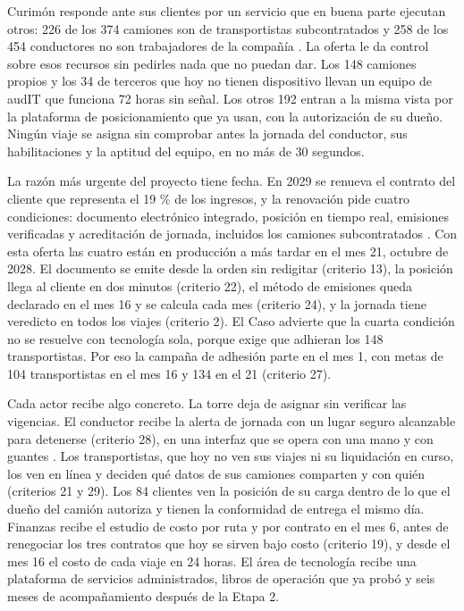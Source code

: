 Curimón responde ante sus clientes por un servicio que en buena parte ejecutan otros: 226 de los 374
camiones son de transportistas subcontratados  y 258 de los 454 conductores no son
trabajadores de la compañía . La oferta le da control sobre esos recursos sin
pedirles nada que no puedan dar. Los 148 camiones propios y los 34 de terceros que hoy no tienen
dispositivo llevan un equipo de audIT que funciona 72 horas sin señal. Los otros 192 entran a la misma
vista por la plataforma de posicionamiento que ya usan, con la autorización de su dueño.
Ningún viaje se asigna sin comprobar antes la jornada del conductor, sus habilitaciones y la aptitud del
equipo, en no más de 30 segundos.

La razón más urgente del proyecto tiene fecha. En 2029 se renueva el contrato del cliente que
representa el 19 \% de los ingresos, y la renovación pide cuatro condiciones: documento electrónico
integrado, posición en tiempo real, emisiones verificadas y acreditación de jornada, incluidos los
camiones subcontratados . Con esta oferta las cuatro están en producción a más
tardar en el mes 21, octubre de 2028. El documento se emite desde la orden sin redigitar (criterio 13),
la posición llega al cliente en dos minutos (criterio 22), el método de emisiones queda declarado en el
mes 16 y se calcula cada mes (criterio 24), y la jornada tiene veredicto en todos los viajes (criterio
2). El Caso advierte que la cuarta condición no se resuelve con tecnología sola, porque exige que
adhieran los 148 transportistas. Por eso la campaña de adhesión parte en el mes 1, con metas de 104
transportistas en el mes 16 y 134 en el 21 (criterio 27).

Cada actor recibe algo concreto. La torre deja de asignar sin verificar las vigencias. El conductor
recibe la alerta de jornada con un lugar seguro alcanzable para detenerse (criterio 28), en una interfaz
que se opera con una mano y con guantes . Los transportistas, que hoy no ven sus
viajes ni su liquidación en curso, los ven en línea y deciden qué datos de sus camiones comparten y con
quién (criterios 21 y 29). Los 84 clientes ven la posición de su carga dentro de lo que el dueño del
camión autoriza y tienen la conformidad de entrega el mismo día. Finanzas recibe el estudio de costo
por ruta y por contrato en el mes 6, antes de renegociar los tres contratos que hoy se sirven bajo
costo (criterio 19), y desde el mes 16 el costo de cada viaje en 24 horas. El área de tecnología recibe
una plataforma de servicios administrados, libros de operación que ya probó y seis meses de
acompañamiento después de la Etapa 2.

